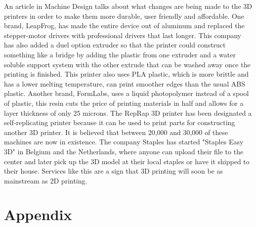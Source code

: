 \documentclass[12pt,twocolumn]{article}
\begin{document}
\indent	An article in Machine Design talks about what changes are being made to the 3D printers in order to make them more durable, user friendly and affordable. One brand, LeapFrog, has made the entire device out of aluminum and  replaced the stepper-motor drivers with professional drivers that last longer. This company has also added a duel option extruder so that the printer could construct something like a bridge by adding the plastic from one extruder and a water soluble support system with the other extrude that can be washed away once the printing is finished. This printer also uses PLA plastic, which is more brittle and has a lower melting temperature, can print smoother edges than the usual ABS plastic. Another brand, FormLabs, uses a liquid photopolymer instead of a spool of plastic, this resin cuts the price of printing materials in half and allows for a layer thickness of only 25 microns. The RepRap 3D printer has been designated a self-replicating printer because it can be used to print parts for constructing another 3D printer. It is believed that between 20,000 and 30,000 of these machines are now in existence. The company Staples has started "Staples Easy 3D" in Belgium and the Netherlands, where anyone can upload their file to the center and later pick up the 3D model at their local staples or have it shipped to their house. Services like this are a sign that 3D printing will soon be as mainstream as 2D printing.  \cite{cite7}



\section{}


\section{Appendix} 
\end{document}

